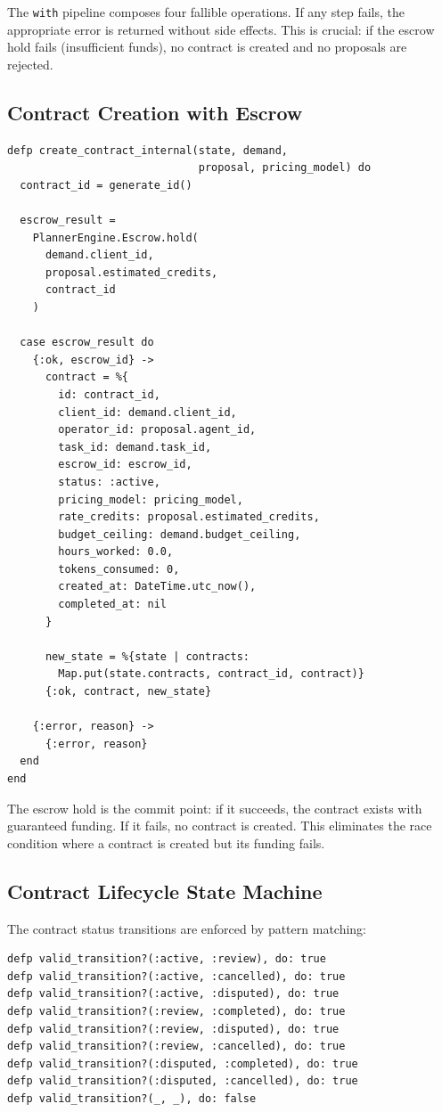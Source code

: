 \documentclass[12pt,a4paper]{article}
\theoremstyle{plain}
\theoremstyle{definition}
\begin{document}
The \texttt{with} pipeline composes four fallible operations. If any step fails, the appropriate error is returned without side effects. This is crucial: if the escrow hold fails (insufficient funds), no contract is created and no proposals are rejected.

\subsection{Contract Creation with Escrow}

\begin{lstlisting}[caption={Contract creation with escrow hold},label={lst:market-contract}]
defp create_contract_internal(state, demand,
                              proposal, pricing_model) do
  contract_id = generate_id()

  escrow_result =
    PlannerEngine.Escrow.hold(
      demand.client_id,
      proposal.estimated_credits,
      contract_id
    )

  case escrow_result do
    {:ok, escrow_id} ->
      contract = %{
        id: contract_id,
        client_id: demand.client_id,
        operator_id: proposal.agent_id,
        task_id: demand.task_id,
        escrow_id: escrow_id,
        status: :active,
        pricing_model: pricing_model,
        rate_credits: proposal.estimated_credits,
        budget_ceiling: demand.budget_ceiling,
        hours_worked: 0.0,
        tokens_consumed: 0,
        created_at: DateTime.utc_now(),
        completed_at: nil
      }

      new_state = %{state | contracts:
        Map.put(state.contracts, contract_id, contract)}
      {:ok, contract, new_state}

    {:error, reason} ->
      {:error, reason}
  end
end
\end{lstlisting}

The escrow hold is the commit point: if it succeeds, the contract exists with guaranteed funding. If it fails, no contract is created. This eliminates the race condition where a contract is created but its funding fails.

\subsection{Contract Lifecycle State Machine}

The contract status transitions are enforced by pattern matching:

\begin{lstlisting}[caption={State transition validation},label={lst:market-transitions}]
defp valid_transition?(:active, :review), do: true
defp valid_transition?(:active, :cancelled), do: true
defp valid_transition?(:active, :disputed), do: true
defp valid_transition?(:review, :completed), do: true
defp valid_transition?(:review, :disputed), do: true
defp valid_transition?(:review, :cancelled), do: true
defp valid_transition?(:disputed, :completed), do: true
defp valid_transition?(:disputed, :cancelled), do: true
defp valid_transition?(_, _), do: false
\end{lstlisting}
\end{document}
